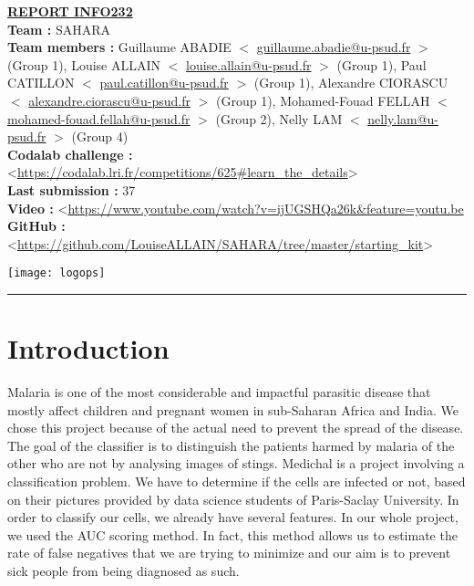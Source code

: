 \documentclass[10pt]{report}
\begin{document}
\begin{minipage}[c]{.60\linewidth} 
\begin{flushleft}
\textbf{\underline{\Large{REPORT INFO232}}} \\
\scriptsize{\textbf{Team : } SAHARA \\
\textbf{Team members : } Guillaume ABADIE $<$ \href{mailto:guillaume.abadie@u-psud.fr}{guillaume.abadie@u-psud.fr} $>$ (Group 1), Louise ALLAIN  $<$ \href{mailto:louise.allain@u-psud.fr}{louise.allain@u-psud.fr} $>$ (Group 1), Paul CATILLON  $<$ \href{mailto:paul.catillon@u-psud.fr}{paul.catillon@u-psud.fr} $>$ (Group 1), Alexandre CIORASCU  $<$ \href{mailto:alexandre.ciorascu@u-psud.fr}{alexandre.ciorascu@u-psud.fr} $>$ (Group 1), Mohamed-Fouad FELLAH  $<$ \href{mailto:mohamed-fouad.fellah@u-psud.fr}{mohamed-fouad.fellah@u-psud.fr} $>$ (Group 2), Nelly LAM  $<$ \href{mailto:nelly.lam@u-psud.fr}{nelly.lam@u-psud.fr} $>$ (Group 4) \\
\textbf{Codalab challenge : }  <\url{https://codalab.lri.fr/competitions/625#learn_the_details}> \\
\textbf{Last submission : } 37 \\
\textbf{Video :} <\url{https://www.youtube.com/watch?v=ijUGSHQa26k&feature=youtu.be} \\
\textbf{GitHub : } <\url{https://github.com/LouiseALLAIN/SAHARA/tree/master/starting_kit}> \\}

\end{flushleft}
\end{minipage}
\begin{minipage}[c]{.40\linewidth}
\begin{flushright}
\medbreak
\texttt{[image: logops]}
\end{flushright}
\end{minipage}

\bigbreak

\rule{1\linewidth}{1pt}

\bigbreak

\section*{Introduction}

\bigbreak

Malaria is one of the most considerable and impactful parasitic disease that mostly affect children and pregnant women in sub-Saharan Africa and India. We chose this project because of the actual need to prevent the spread of the disease. The goal of the classifier is to distinguish the patients harmed by malaria of the other who are not by analysing images of stings. \medbreak
Medichal is a project involving a classification problem. We have to determine if the cells are infected or not, based on their pictures provided by data science students of Paris-Saclay University. In order to classify our cells, we already have several features. \medbreak
In our whole project, we used the AUC scoring method. In fact, this method allows us to estimate the rate of false negatives that we are trying to minimize and our aim is to prevent sick people from being diagnosed as such.
\end{document}
